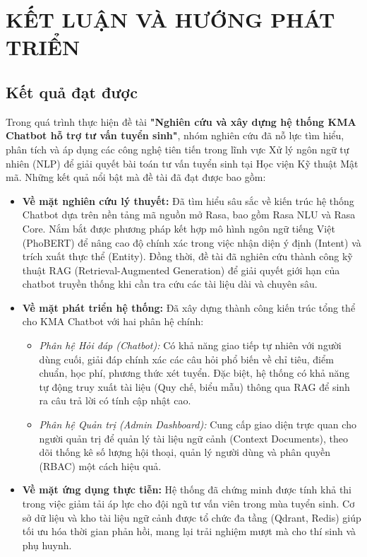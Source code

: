 \chapter{KẾT LUẬN VÀ HƯỚNG PHÁT TRIỂN}

\section{Kết quả đạt được}
Trong quá trình thực hiện đề tài \textbf{"Nghiên cứu và xây dựng hệ thống KMA Chatbot hỗ trợ tư vấn tuyển sinh"}, nhóm nghiên cứu đã nỗ lực tìm hiểu, phân tích và áp dụng các công nghệ tiên tiến trong lĩnh vực Xử lý ngôn ngữ tự nhiên (NLP) để giải quyết bài toán tư vấn tuyển sinh tại Học viện Kỹ thuật Mật mã. Những kết quả nổi bật mà đề tài đã đạt được bao gồm:

\begin{itemize}
    \item \textbf{Về mặt nghiên cứu lý thuyết:} Đã tìm hiểu sâu sắc về kiến trúc hệ thống Chatbot dựa trên nền tảng mã nguồn mở Rasa, bao gồm Rasa NLU và Rasa Core. Nắm bắt được phương pháp kết hợp mô hình ngôn ngữ tiếng Việt (PhoBERT) để nâng cao độ chính xác trong việc nhận diện ý định (Intent) và trích xuất thực thể (Entity). Đồng thời, đề tài đã nghiên cứu thành công kỹ thuật RAG (Retrieval-Augmented Generation) để giải quyết giới hạn của chatbot truyền thống khi cần tra cứu các tài liệu dài và chuyên sâu.
    
    \item \textbf{Về mặt phát triển hệ thống:} Đã xây dựng thành công kiến trúc tổng thể cho KMA Chatbot với hai phân hệ chính:
    \begin{itemize}
        \item \textit{Phân hệ Hỏi đáp (Chatbot):} Có khả năng giao tiếp tự nhiên với người dùng cuối, giải đáp chính xác các câu hỏi phổ biến về chỉ tiêu, điểm chuẩn, học phí, phương thức xét tuyển. Đặc biệt, hệ thống có khả năng tự động truy xuất tài liệu (Quy chế, biểu mẫu) thông qua RAG để sinh ra câu trả lời có tính cập nhật cao.
        \item \textit{Phân hệ Quản trị (Admin Dashboard):} Cung cấp giao diện trực quan cho người quản trị để quản lý tài liệu ngữ cảnh (Context Documents), theo dõi thống kê số lượng hội thoại, quản lý người dùng và phân quyền (RBAC) một cách hiệu quả.
    \end{itemize}
    
    \item \textbf{Về mặt ứng dụng thực tiễn:} Hệ thống đã chứng minh được tính khả thi trong việc giảm tải áp lực cho đội ngũ tư vấn viên trong mùa tuyển sinh. Cơ sở dữ liệu và kho tài liệu ngữ cảnh được tổ chức đa tầng (Qdrant, Redis) giúp tối ưu hóa thời gian phản hồi, mang lại trải nghiệm mượt mà cho thí sinh và phụ huynh.
\end{itemize}

